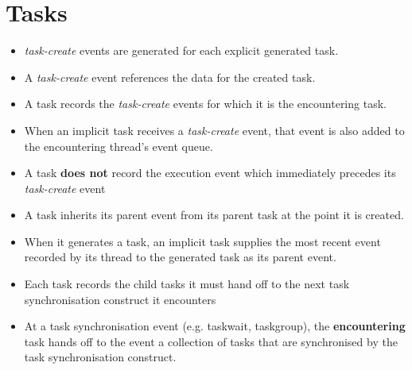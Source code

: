 \documentclass[11pt,a4paper]{article}
\begin{document}
\section{Tasks}

\begin{itemize}
\item \emph{task-create} events are generated for each explicit generated task.
\item A \emph{task-create} event references the data for the created task.
\item A task records the \emph{task-create} events for which it is the encountering task.
\item When an implicit task receives a \emph{task-create} event, that event is also added to the encountering thread's event queue.
\item A task \textbf{does not} record the execution event which immediately precedes its \emph{task-create} event
\item A task inherits its parent event from its parent task at the point it is created.
\item When it generates a task, an implicit task supplies the most recent event recorded by its thread to the generated task as its parent event.
\item Each task records the child tasks it must hand off to the next task synchronisation construct it encounters
\item At a task synchronisation event (e.g. taskwait, taskgroup), the \textbf{encountering} task hands off to the event a collection of tasks that are synchronised by the task synchronisation construct.
\end{itemize}
\end{document}
